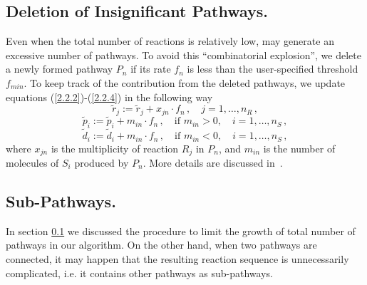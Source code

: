 \subsection{Deletion of Insignificant Pathways.}
\label{sec2c4}
Even when the total number of reactions is relatively low, \pump{} may generate an excessive number of pathways.  To avoid this ``combinatorial explosion'',  we delete a newly formed pathway $P_n$ if its rate $f_n$ is less than the user-specified threshold $f_{min}$.  To keep track of the contribution from the deleted pathways, we update equations (\ref{2.2.2})-(\ref{2.2.4}) in the following way
\begin{equation}
\tilde{r}_j := \tilde{r}_j + x_{jn}\cdot f_n\,,  \quad j = 1,\ldots, n_R\,,
\label{2.6.0}
\end{equation}
\begin{equation}
\tilde{p}_i := \tilde{p}_i + m_{in}\cdot f_n\,, \quad \textrm{if } m_{in} >0, \quad i = 1,\ldots, n_S\,,
\label{2.6.1}
\end{equation}
\begin{equation}
\tilde{d}_i := \tilde{d}_i + m_{in}\cdot f_n\,, \quad \textrm{if } m_{in} <0, \quad i = 1,\ldots, n_S\,,
\label{2.6.2}
\end{equation}
 where $x_{jn}$ is the multiplicity of reaction $R_j$ in $P_n$, and $m_{in}$ is the number of molecules of $S_i$ produced by $P_n$. More details are discussed in~\cite{Lehmann2004/JAC}.
  

\subsection{Sub-Pathways.}
\label{sec2c5}
In section \ref{sec2c4} we discussed the procedure to limit the growth of total number of pathways in our algorithm.  On the other hand, when two pathways are connected, it may happen that the resulting reaction sequence is unnecessarily complicated, i.e. it contains other pathways as sub-pathways. 

